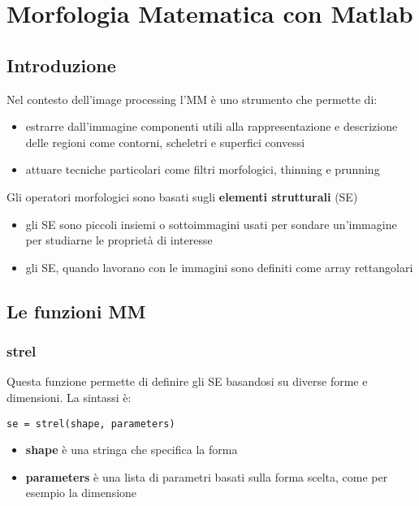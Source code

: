 \chapter{Morfologia Matematica con Matlab}

\section{Introduzione}
Nel contesto dell'image processing l'MM è uno strumento che permette di:

\begin{itemize}
	\item estrarre dall'immagine componenti utili alla rappresentazione e descrizione delle regioni come contorni, scheletri e superfici convessi
	
	\item attuare tecniche particolari come filtri morfologici, thinning e prunning
\end{itemize}

Gli operatori morfologici sono basati sugli \textbf{elementi strutturali} (SE)

\begin{itemize}
	\item gli SE sono piccoli insiemi o sottoimmagini usati per sondare un'immagine per studiarne le proprietà di interesse
	
	\item gli SE, quando lavorano con le immagini sono definiti come array rettangolari
\end{itemize}

\section{Le funzioni MM}

\subsection{strel}
Questa funzione permette di definire gli SE basandosi su diverse forme e dimensioni. La sintassi è:

\begin{lstlisting}
se = strel(shape, parameters)
\end{lstlisting}

\begin{itemize}
	\item \textbf{shape} è una stringa che specifica la forma
	\item \textbf{parameters} è una lista di parametri basati sulla forma scelta, come per esempio la dimensione
\end{itemize}

